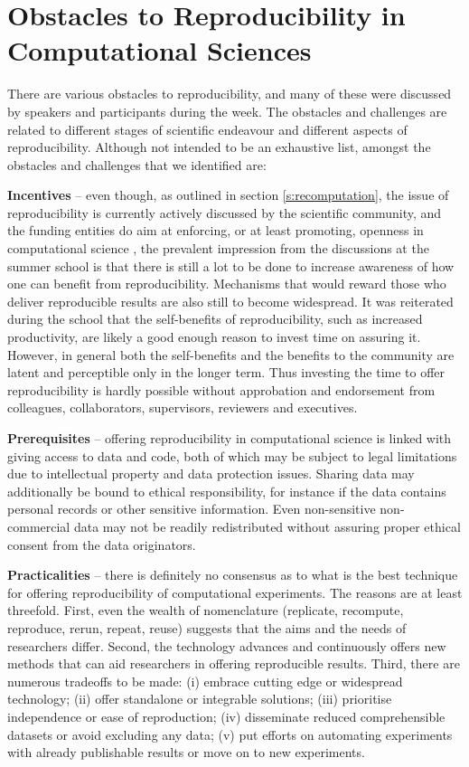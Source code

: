 \section{Obstacles to Reproducibility in Computational Sciences}
\label{s:obstacles}

There are various obstacles to reproducibility, and many of these were
  discussed by speakers and participants during the week. 
The obstacles and challenges are related to different stages of scientific 
  endeavour and different aspects of reproducibility.
Although not intended to be an exhaustive list, amongst the obstacles and 
  challenges that we identified are:

{\bf Incentives} -- even though, as outlined in section \ref{s:recomputation}, 
  the issue of reproducibility is
  currently actively discussed by the scientific community, 
  and the funding entities do aim at enforcing, or at least promoting,
  openness in computational science \citep[see e.g.]{NSF}, 
  the prevalent impression from the discussions at 
  the summer school is that there is still a lot to be done to increase 
  awareness of how one can benefit from reproducibility.
Mechanisms that would reward those who deliver reproducible results are also
  still to become widespread.
It was reiterated during the school that the self-benefits 
  of reproducibility, such as increased productivity, are likely 
  a good enough reason to invest time on assuring it.
However, in general both the self-benefits and the benefits to the community
  are latent and perceptible only in the longer term.
Thus investing the time to offer reproducibility is hardly possible without
  approbation and endorsement from colleagues, collaborators, supervisors,
  reviewers and executives.
  
{\bf Prerequisites} -- offering reproducibility in computational
  science is linked with giving access to data and code, both of which may
  be subject to legal limitations due to intellectual property and
  data protection issues.
Sharing data may additionally be bound to ethical responsibility, for instance
  if the data contains personal records or other sensitive information.  
Even non-sensitive non-commercial data may not be readily redistributed
  without assuring proper ethical consent from the data originators.

{\bf Practicalities} -- there is definitely no consensus as to what is the
  best technique for offering reproducibility of computational experiments. 
The reasons are at least threefold. 
First, even the wealth of nomenclature (replicate, recompute, reproduce, 
  rerun, repeat, reuse) suggests that the aims and the needs of researchers
  differ.
Second, the technology advances and continuously offers new methods that can
  aid researchers in offering reproducible results.
Third, there are numerous tradeoffs to be made: 
  (i) embrace cutting edge or widespread technology; 
  (ii) offer standalone or integrable solutions; 
  (iii) prioritise independence or ease of reproduction; 
  (iv) disseminate reduced comprehensible datasets or avoid excluding any data;
  (v) put efforts on automating experiments with already publishable results or
    move on to new experiments.
    
